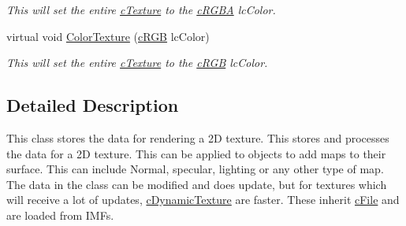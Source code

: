 \begin{DoxyCompactItemize}
\begin{DoxyCompactList}\small\item\em This will set the entire \hyperlink{classc_texture}{cTexture} to the \hyperlink{classc_r_g_b_a}{cRGBA} lcColor. \end{DoxyCompactList}\item 
\hypertarget{classc_texture_a601b595349748c3d928023f489c78111}{
virtual void \hyperlink{classc_texture_a601b595349748c3d928023f489c78111}{ColorTexture} (\hyperlink{classc_r_g_b}{cRGB} lcColor)}
\label{classc_texture_a601b595349748c3d928023f489c78111}

\begin{DoxyCompactList}\small\item\em This will set the entire \hyperlink{classc_texture}{cTexture} to the \hyperlink{classc_r_g_b}{cRGB} lcColor. \end{DoxyCompactList}\end{DoxyCompactItemize}


\subsection{Detailed Description}
This class stores the data for rendering a 2D texture. This stores and processes the data for a 2D texture. This can be applied to objects to add maps to their surface. This can include Normal, specular, lighting or any other type of map. The data in the class can be modified and does update, but for textures which will receive a lot of updates, \hyperlink{classc_dynamic_texture}{cDynamicTexture} are faster. These inherit \hyperlink{classc_file}{cFile} and are loaded from IMFs. 